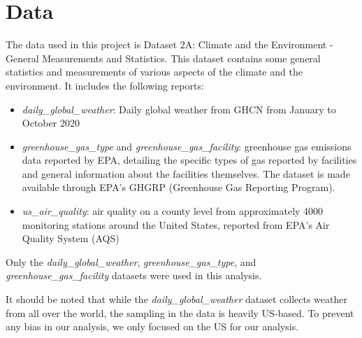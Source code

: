 \section{Data}
The data used in this project is Dataset 2A: Climate and the Environment - General Measurements and Statistics. This dataset contains some general statistics and measurements of various aspects of the climate and the environment. It includes the following reports:
\begin{itemize}
    \item \textit{daily\_global\_weather}: Daily global weather from GHCN from January to October 2020
    \item \textit{greenhouse\_gas\_type} and \textit{greenhouse\_gas\_facility}: greenhouse gas emissions data reported by EPA, detailing the specific types of gas reported by facilities and general information about the facilities themselves. The dataset is made available through EPA’s GHGRP (Greenhouse Gas Reporting Program).
    \item \textit{us\_air\_quality}: air quality on a county level from approximately 4000 monitoring stations around the United States, reported from EPA’s Air Quality System (AQS)
\end{itemize}

Only the \textit{daily\_global\_weather}, \textit{greenhouse\_gas\_type}, and \textit{greenhouse\_gas\_facility} datasets were used in this analysis.

It should be noted that while the \textit{daily\_global\_weather} dataset collects weather from all over the world, the sampling in the data is heavily US-based. To prevent any bias in our analysis, we only focused on the US for our analysis. 


